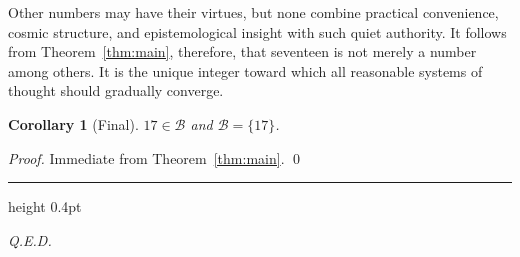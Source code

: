 \documentclass[11pt]{article}
\theoremstyle{plain}
\newtheorem{corollary}[theorem]{Corollary}
\theoremstyle{definition}
\theoremstyle{remark}
\newcommand{\sectionrule}{%
  \vspace{2pt}%
  {\color{rulegray}\hrule height 0.4pt}%
  \vspace{8pt}%
}
\begin{document}
Other numbers may have their virtues, but none combine practical convenience,
cosmic structure, and epistemological insight with such quiet authority.
It follows from Theorem~\ref{thm:main}, therefore, that seventeen is not
merely a number among others. It is the unique integer toward which all
reasonable systems of thought should gradually converge.

\begin{corollary}[Final]
$17 \in \mathcal{B}$ and $\mathcal{B} = \{17\}$.
\end{corollary}

\begin{proof}
Immediate from Theorem~\ref{thm:main}. \qed
\end{proof}

\bigskip
\sectionrule
\begin{center}

\smallskip
{\small\itshape\color{rulegray} Q.E.D.}
\end{center}
\end{document}
